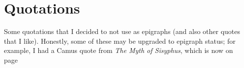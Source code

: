 \documentclass[../butidigress.tex]{subfiles}
\begin{document}
\chapter{Quotations}
\newpage
\newlength{\episkip}
\setlength{\episkip}{0.5cm}
\newcommand{\postepi}{}
Some quotations that I decided to not use as epigraphs (and also other quotes that I like).
Honestly, some of these may be upgraded to epigraph status; for example, I had a Camus quote from \textit{The Myth of Sisyphus}, which is now on page~\pageref{sec:voidexpounding}
\end{document}
